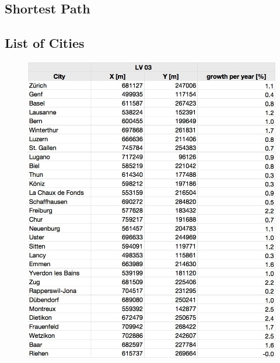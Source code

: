 \documentclass[11pt]{scrartcl}
\begin{document}
\null
\null

\subsection{Shortest Path}
\label{sec:shortest_path}



\subsection{List of Cities}
\begin{figure}[H]
	\centering
	\includegraphics[width=1.0\textwidth]{figures/city_list1}
\end{figure}
\end{document}
